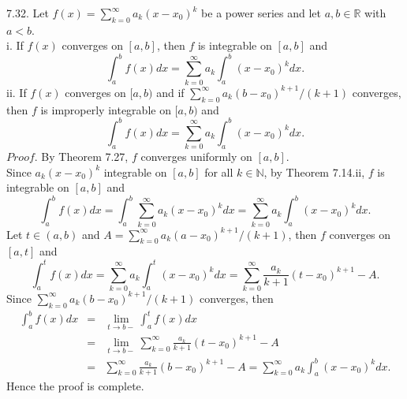 \documentclass[12pt]{book}
\begin{document}
\begin{CJK}{UTF8}{bsmi}
7.32. Let $f(x) = \sum_{k=0}^\infty a_k(x-x_0)^k$ be a power series and let $a, b\in\mathbb{R}$ with $a<b$. \\
i. If $f(x)$ converges on $[a, b]$, then $f$ is integrable on $[a, b]$ and
\[
    \int_a^b f(x) dx 
    = \sum_{k=0}^\infty a_k \int_a^b (x-x_0)^k dx.
\]
ii. If $f(x)$ converges on $[a, b)$ and if $\sum_{k=0}^\infty a_k(b-x_0)^{k+1}/(k+1)$ converges, then $f$ is improperly integrable on $[a, b)$ and
\[
    \int_a^b f(x) dx 
    = \sum_{k=0}^\infty a_k \int_a^b (x-x_0)^k dx.
\]
$Proof$. By Theorem 7.27, $f$ converges uniformly on $[a, b]$. \\
Since $a_k(x-x_0)^k$ integrable on $[a, b]$ for all $k\in\mathbb{N}$, by Theorem 7.14.ii, $f$ is integrable on $[a, b]$ and
\[
    \int_a^b f(x) dx 
    = \int_a^b \sum_{k=0}^\infty a_k(x-x_0)^k dx
    = \sum_{k=0}^\infty a_k \int_a^b (x-x_0)^k dx.
\]
Let $t\in(a, b)$ and $A = \sum_{k=0}^\infty a_k(a-x_0)^{k+1}/(k+1)$, then $f$ converges on $[a, t]$ and
\[
    \int_a^t f(x) dx 
    = \sum_{k=0}^\infty a_k \int_a^t (x-x_0)^k dx
    = \sum_{k=0}^\infty \frac{a_k}{k+1}(t-x_0)^{k+1}-A.
\]
Since $\sum_{k=0}^\infty a_k(b-x_0)^{k+1}/(k+1)$ converges, then
\begin{eqnarray*}
\int_a^b f(x) dx 
    & = & \lim_{t\rightarrow b-} \int_a^t f(x) dx \\
    & = & \lim_{t\rightarrow b-} \sum_{k=0}^\infty \frac{a_k}{k+1}(t-x_0)^{k+1}-A \\
    & = & \sum_{k=0}^\infty \frac{a_k}{k+1}(b-x_0)^{k+1}-A
    = \sum_{k=0}^\infty a_k \int_a^b (x-x_0)^k dx.
\end{eqnarray*}
Hence the proof is complete. \\


\end{CJK}
\end{document}

